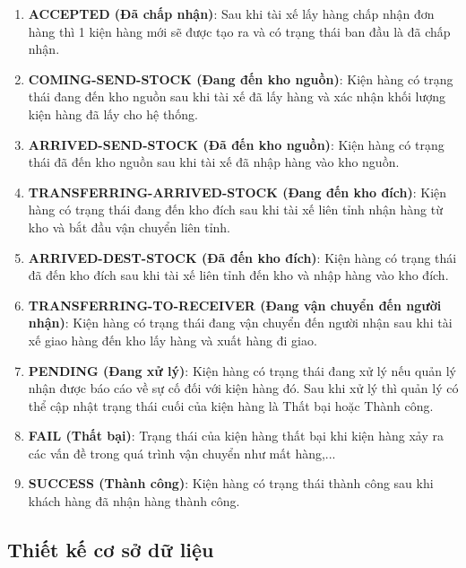 \begin{itemize}
    
    	\begin{enumerate}
    		\item \textbf{ACCEPTED (Đã chấp nhận)}: Sau khi tài xế lấy hàng chấp nhận đơn hàng thì 1 kiện hàng mới sẽ được tạo ra và có trạng thái ban đầu là đã chấp nhận.
    		\item \textbf{COMING-SEND-STOCK (Đang đến kho nguồn)}: Kiện hàng có trạng thái đang đến kho nguồn sau khi tài xế đã lấy hàng và xác nhận khối lượng kiện hàng đã lấy cho hệ thống.
    		\item \textbf{ARRIVED-SEND-STOCK (Đã đến kho nguồn)}: Kiện hàng có trạng thái đã đến kho nguồn sau khi tài xế đã nhập hàng vào kho nguồn.
    		\item \textbf{TRANSFERRING-ARRIVED-STOCK (Đang đến kho đích)}: Kiện hàng có trạng thái đang đến kho đích sau khi tài xế liên tỉnh nhận hàng từ kho và bắt đầu vận chuyển liên tỉnh.
    		\item \textbf{ARRIVED-DEST-STOCK (Đã đến kho đích)}: Kiện hàng có trạng thái đã đến kho đích sau khi tài xế liên tỉnh đến kho và nhập hàng vào kho đích.
    		\item \textbf{TRANSFERRING-TO-RECEIVER (Đang vận chuyển đến người nhận)}: Kiện hàng có trạng thái đang vận chuyển đến người nhận sau khi tài xế giao hàng đến kho lấy hàng và xuất hàng đi giao.
    		\item \textbf{PENDING (Đang xử lý)}: Kiện hàng có trạng thái đang xử lý nếu quản lý nhận được báo cáo về sự cố đối với kiện hàng đó. Sau khi xử lý thì quản lý có thể cập nhật trạng thái cuối của kiện hàng là Thất bại hoặc Thành công.
    		\item \textbf{FAIL (Thất bại)}: Trạng thái của kiện hàng thất bại khi kiện hàng xảy ra các vấn đề trong quá trình vận chuyển như mất hàng,...
    		\item \textbf{SUCCESS (Thành công)}: Kiện hàng có trạng thái thành công sau khi khách hàng đã nhận hàng thành công.
    	\end{enumerate}
    
    
    \end{itemize}
	
	\subsection{Thiết kế cơ sở dữ liệu}
	
